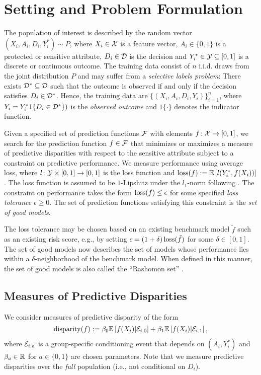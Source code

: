 \documentclass{article}
\begin{document}
\section{Setting and Problem Formulation}\label{section: set-up}
The population of interest is described by the random vector $(X_i, A_i, D_i, Y_i^*) \sim P$, where $X_i \in \mathcal{X}$ is a feature vector, $A_i \in \{0,1\}$ is a protected or sensitive attribute, $D_i \in \mathcal{D}$ is the decision and $Y_i^* \in \mathcal{Y} \subseteq [0, 1]$ is a discrete or continuous outcome. The training data consist of $n$ i.i.d. draws from the joint distribution $P$ and may suffer from a \textit{selective labels problem}: There exists $\mathcal{D}^* \subseteq \mathcal{D}$ such that the outcome is observed if and only if the decision satisfies $D_i \in \mathcal{D}^*$. Hence, the training data are $\{(X_i, A_i, D_i, Y_i)\}_{i=1}^{n}$, where $Y_i = Y_i^* 1\{D_i \in \mathcal{D}^*\})$ is the \textit{observed outcome} and $1\{\cdot\}$ denotes the indicator function.

Given a specified set of prediction functions $\mathcal{F}$ with elements $f \colon \mathcal{X} \rightarrow [0, 1]$, we search for the prediction function $f \in \mathcal{F}$ that minimizes or maximizes a measure of predictive disparities with respect to the sensitive attribute subject to a constraint on predictive performance. We measure performance using average loss, where $l \colon \mathcal{Y} \times [0, 1]\rightarrow [0, 1]$ is the loss function and $\operatorname{loss}(f) := \mathbb{E}\left[ l(Y_i^*, f(X_i)) \right]$. The loss function is assumed to be $1$-Lipshitz under the $l_1$-norm following \cite{AgarwalEtAl(19)-FairRegression}. The constraint on performance takes the form $\operatorname{loss}(f) \leq \epsilon$ for some specified \textit{loss tolerance} $\epsilon \geq 0$. The set of prediction functions satisfying this constraint is the \textit{set of good models}.

The loss tolerance may be chosen based on an existing benchmark model $\tilde f$ such as an existing risk score, e.g., by setting $\epsilon = (1 + \delta) \operatorname{loss}(\tilde f)$ for some $\delta \in [0, 1]$. The set of good models now describes the set of models whose performance lies within a $\delta$-neighborhood of the benchmark model. When defined in this manner, the set of good models is also called the ``Rashomon set'' \cite{Rudin(19), FisherEtAl(19), DongRudin(20), SemenovaEtAl(20)}.

\subsection{Measures of Predictive Disparities}
We consider measures of predictive disparity of the form
    \begin{equation}\label{equation: definition of disparity}
        \operatorname{disparity}(f) := \beta_0 \mathbb{E}\left[ f(X_i) | \mathcal{E}_{i,0} \right] + \beta_1 \mathbb{E}\left[ f(X_i) | \mathcal{E}_{i,1} \right],
    \end{equation}
where $\mathcal{E}_{i,a}$ is a group-specific conditioning event that depends on $(A_i, Y_i^*)$ and $\beta_a \in \mathbb{R}$ for $a \in \{0, 1\}$ are chosen parameters. Note that we measure predictive disparities over the \textit{full} population (i.e., not conditional on $D_i$).
\end{document}

